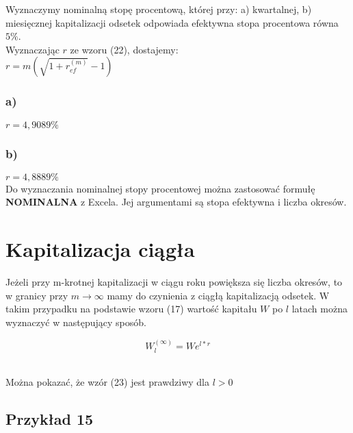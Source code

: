 \documentclass{article}
\begin{document}
Wyznaczymy nominalną stopę procentową, której przy: a) kwartalnej, b) miesięcznej kapitalizacji odsetek odpowiada efektywna stopa procentowa równa $ 5 \% $.\\

Wyznaczając $ r $ ze wzoru (22), dostajemy:\\

$ r = m(\sqrt{1 + r^{(m)}_{ef}} - 1) $

\subsubsection{a)}

$ r = 4,9089 \% $

\subsubsection{b)}

$ r = 4,8889 \% $\\

Do wyznaczania nominalnej stopy procentowej można zastosować formułę \textbf{NOMINALNA} z Excela. Jej argumentami są stopa efektywna i liczba okresów.\\

\newpage

%
%

\section{Kapitalizacja ciągła}

Jeżeli przy m-krotnej kapitalizacji w ciągu roku powiększa się liczba okresów, to w granicy przy $ m \rightarrow \infty $ mamy do czynienia z ciągłą kapitalizacją odsetek. W takim przypadku na podstawie wzoru (17) wartość kapitału $ W $ po $ l $ latach można wyznaczyć w następujący sposób.\\

\begin{center}
	\begin{equation}
		W^{(\infty)}_l = We^{l * r}
	\end{equation}
\end{center}\\

Można pokazać, że wzór (23) jest prawdziwy dla $ l> 0 $

\subsection{Przykład 15}
\end{document}
